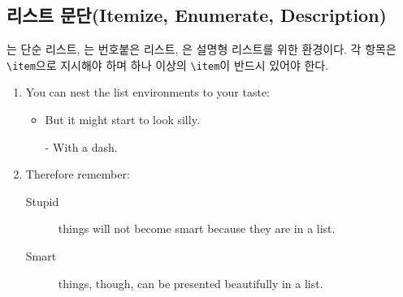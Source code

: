 \subsection{리스트 문단(Itemize, Enumerate, Description)}

는 단순 리스트,
는 번호붙은 리스트,
은 설명형 리스트를 위한 환경이다. 
각 항목은 \verb|\item|으로 지시해야 하며 하나 이상의 \verb|\item|이 반드시 있어야 한다.

\begin{example}
\flushleft
\begin{enumerate}
\item You can nest the list
environments to your taste:
\begin{itemize}
\item But it might start to
look silly.
\item[-] With a dash.
\end{itemize}
\item Therefore remember:
\begin{description}
\item[Stupid] things will not
become smart because they are
in a list.
\item[Smart] things, though,
can be presented beautifully
in a list.
\end{description}
\end{enumerate}
\end{example}

